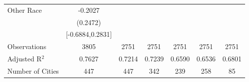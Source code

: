 \documentclass{article}
\begin{document}
\begin{table}[htbp]
\begin{tabular}{l*{6}{c}}
Other Race          &     -0.2027   &               &               &               &               &               \\
                    &    (0.2472)   &               &               &               &               &               \\
                    &[-0.6884,0.2831]   &               &               &               &               &               \\
\midrule
Observations        &        3805   &        2751   &        2751   &        2751   &        2751   &        2751   \\
Adjusted R$^2$      &      0.7627   &      0.7214   &      0.7239   &      0.6590   &      0.6536   &      0.6801   \\
Number of Cities    &         447   &         447   &         342   &         239   &         258   &          85   \\
\bottomrule
\end{tabular}
\end{table}
\end{document}
